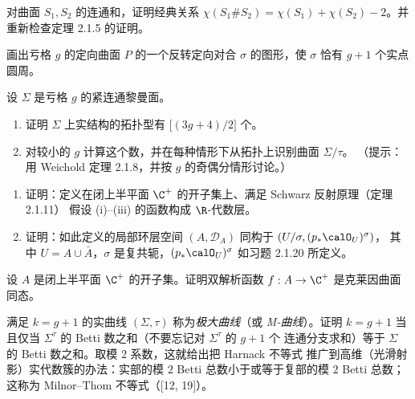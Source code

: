 \begin{exercise}\label{ex:2.1.22}
对曲面 $S_1,S_2$ 的连通和，证明经典关系
$\chi(S_1\#S_2)=\chi(S_1)+\chi(S_2)-2$。并重新检查定理 2.1.5 的证明。
\end{exercise}

\begin{exercise}\label{ex:2.1.23}
画出亏格 $g$ 的定向曲面 $P$ 的一个反转定向对合 $\sigma$ 的图形，使 $\sigma$ 恰有
$g+1$ 个实点圆周。
\end{exercise}

\begin{exercise}\label{ex:2.1.24}
设 $\Sigma$ 是亏格 $g$ 的紧连通黎曼面。
\begin{enumerate}[label=(\roman*), leftmargin=2.2em, itemsep=0.15em]
\item 证明 $\Sigma$ 上实结构的拓扑型有 $\bigl[(3g+4)/2\bigr]$ 个。
\item 对较小的 $g$ 计算这个数，并在每种情形下从拓扑上识别曲面 $\Sigma/\tau$。
      （提示：用 Weichold 定理 2.1.8，并按 $g$ 的奇偶分情形讨论。）
\end{enumerate}
\end{exercise}

\begin{exercise}\label{ex:2.1.25}
\begin{enumerate}[label=(\roman*), leftmargin=2.2em, itemsep=0.15em]
\item 证明：定义在闭上半平面 $\C^+$ 的开子集上、满足 Schwarz 反射原理（定理 2.1.11）
      假设 (i)--(iii) 的函数构成 $\R$-代数层。
\item 证明：如此定义的局部环层空间 $(A,\mathcal{D}_A)$ 同构于 $(U/\sigma,(p_*\calO_U)^\sigma)$，
      其中 $U=A\cup\bar A$，$\sigma$ 是复共轭，$(p_*\calO_U)^\sigma$ 如习题 2.1.20 所定义。
\end{enumerate}
\end{exercise}

\begin{exercise}\label{ex:2.1.26}
设 $A$ 是闭上半平面 $\C^+$ 的开子集。证明双解析函数 $f:A\to\C^+$ 是克莱因曲面同态。
\end{exercise}

\begin{exercise}\label{ex:2.1.27}
满足 $k=g+1$ 的实曲线 $(\Sigma,\tau)$ 称为\emph{极大曲线}（或 \emph{M-曲线}）。证明
$k=g+1$ 当且仅当 $\Sigma^\tau$ 的 Betti 数之和（不要忘记对 $\Sigma^\tau$ 的 $g+1$ 个
连通分支求和）等于 $\Sigma$ 的 Betti 数之和。取模 $2$ 系数，这就给出把 Harnack 不等式
推广到高维（光滑射影）实代数簇的办法：实部的模 $2$ Betti 总数小于或等于复部的模 $2$
Betti 总数；这称为 Milnor--Thom 不等式（[12, 19]）。
\end{exercise}

